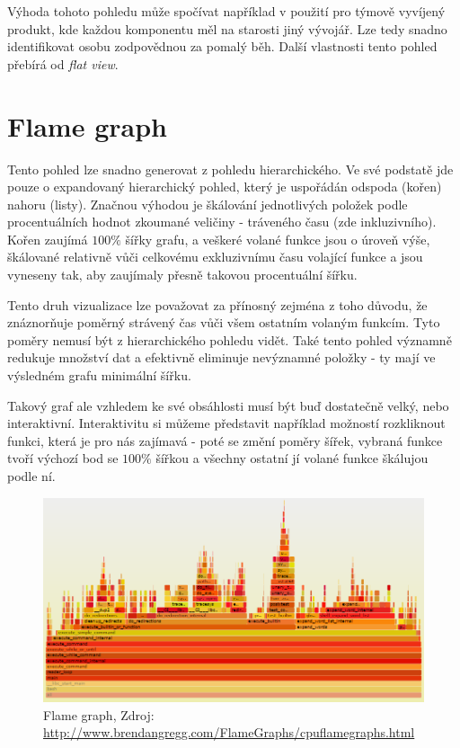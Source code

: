 \documentclass[czech,BP]{thesiskiv}
\begin{document}
Výhoda tohoto pohledu může spočívat například v použití pro týmově vyvíjený produkt, kde každou komponentu měl na starosti jiný vývojář. Lze tedy snadno identifikovat osobu zodpovědnou za pomalý běh. Další vlastnosti tento pohled přebírá od \emph{flat view}.

\section{Flame graph}

Tento pohled lze snadno generovat z pohledu hierarchického. Ve své podstatě jde pouze o expandovaný hierarchický pohled, který je uspořádán odspoda (kořen) nahoru (listy)\cite{flamecite}. Značnou výhodou je škálování jednotlivých položek podle procentuálních hodnot zkoumané veličiny - tráveného času (zde inkluzivního). Kořen zaujímá $100\%$ šířky grafu, a veškeré volané funkce jsou o úroveň výše, škálované relativně vůči celkovému exkluzivnímu času volající funkce a jsou vyneseny tak, aby zaujímaly přesně takovou procentuální šířku.

Tento druh vizualizace lze považovat za přínosný zejména z toho důvodu, že znáznorňuje poměrný strávený čas vůči všem ostatním volaným funkcím. Tyto poměry nemusí být z hierarchického pohledu vidět. Také tento pohled významně redukuje množství dat a efektivně eliminuje nevýznamné položky - ty mají ve výsledném grafu minimální šířku.

Takový graf ale vzhledem ke své obsáhlosti musí být buď dostatečně velký, nebo interaktivní. Interaktivitu si můžeme představit například možností rozkliknout funkci, která je pro nás zajímavá - poté se změní poměry šířek, vybraná funkce tvoří výchozí bod se $100\%$ šířkou a všechny ostatní jí volané funkce škálujou podle ní.

\begin{figure}[h]
    \centering
    \includegraphics[interpolate,width=1.0\textwidth]{img/prof_flame.png}
    \caption{Flame graph, Zdroj: \url{http://www.brendangregg.com/FlameGraphs/cpuflamegraphs.html} }
    \label{obr:flamegr}
\end{figure}
\end{document}
